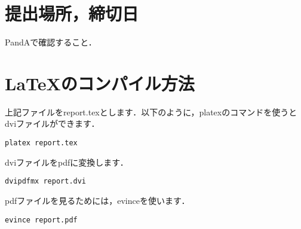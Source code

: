 \documentclass{jarticle}
\begin{document}
\section*{提出場所，締切日}
PandAで確認すること．

\vspace{10\baselineskip}
\section*{\LaTeX のコンパイル方法}
上記ファイルをreport.texとします．以下のように，platexのコマンドを使うとdviファイルができます．
\begin{verbatim}
platex report.tex
\end{verbatim}
dviファイルをpdfに変換します．
\begin{verbatim}
dvipdfmx report.dvi
\end{verbatim}
pdfファイルを見るためには，evinceを使います．
\begin{verbatim}
evince report.pdf
\end{verbatim}
\end{document}
